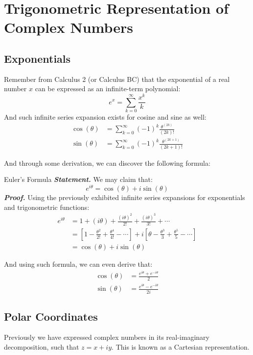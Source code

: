 \section{Trigonometric Representation of Complex Numbers}
\subsection{Exponentials}
Remember from Calculus 2 (or Calculus BC) that the exponential of a real number $x$ can be expressed as an infinite-term polynomial:
\[
    e^x = \sum_{k=0}^\infty \frac{x^k}{k}
\]
And such infinite series expansion exists for cosine and sine as well:
\begin{align*}
    \cos(\theta) &= \sum_{k=0}^\infty {(-1)}^k \frac{\theta^(2k)}{(2k)!} \\
    \sin(\theta) &= \sum_{k=0}^\infty {(-1)}^k \frac{\theta^(2k + 1)}{(2k + 1)!}
\end{align*}

And through some derivation, we can discover the following formula:
\begin{ln-theorem}{Euler's Formula}{}
    \textbf{\textit{Statement.}} We may claim that:
    \[
        e^{i \theta} = \cos(\theta) + i \sin(\theta)
    \]
    \tcblower
    \textbf{\textit{Proof.}} Using the previously exhibited infinite series expansions for exponentials and trigonometric functions:
    \begin{align*}
        e^{i \theta}
        &= 1 + (i \theta) + \frac{{(i \theta)}^2}{2!} + \frac{{(i \theta)}^3}{3!} + \cdots \\
        &= [1 - \frac{\theta^2}{2!} + \frac{\theta^4}{4!} - \cdots] + i [\theta - \frac{\theta^3}{3} + \frac{\theta^5}{5} - \cdots] \\
        &= \cos(\theta) + i \sin(\theta)
    \end{align*}
\end{ln-theorem}
And using such formula, we can even derive that:
\begin{align*}
    \cos(\theta) &= \frac{e^{i \theta} + e^{-i \theta}}{2} \\
    \sin(\theta) &= \frac{e^{i \theta} - e^{-i \theta}}{2i}
\end{align*}


\subsection{Polar Coordinates}
Previously we have expressed complex numbers in its real-imaginary decomposition, such that $z = x + i y$.
This is known as a Cartesian representation.

